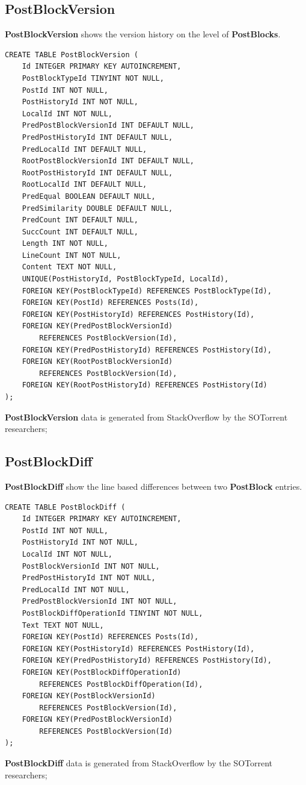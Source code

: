 \documentclass[a4paper,11pt, notitlepage]{report}
\theoremstyle{definition}
\numberwithin{equation}{section}		%
\begin{document}
\subsection{PostBlockVersion}
\textbf{PostBlockVersion} shows the version history on the level of \textbf{PostBlocks}.
\begin{lstlisting}
CREATE TABLE PostBlockVersion (
    Id INTEGER PRIMARY KEY AUTOINCREMENT,
    PostBlockTypeId TINYINT NOT NULL,
    PostId INT NOT NULL,
    PostHistoryId INT NOT NULL,
    LocalId INT NOT NULL,
    PredPostBlockVersionId INT DEFAULT NULL,
    PredPostHistoryId INT DEFAULT NULL,
    PredLocalId INT DEFAULT NULL,
    RootPostBlockVersionId INT DEFAULT NULL,
    RootPostHistoryId INT DEFAULT NULL,
    RootLocalId INT DEFAULT NULL,
    PredEqual BOOLEAN DEFAULT NULL,
    PredSimilarity DOUBLE DEFAULT NULL,
    PredCount INT DEFAULT NULL,
    SuccCount INT DEFAULT NULL,
    Length INT NOT NULL,
    LineCount INT NOT NULL,
    Content TEXT NOT NULL,
    UNIQUE(PostHistoryId, PostBlockTypeId, LocalId),
    FOREIGN KEY(PostBlockTypeId) REFERENCES PostBlockType(Id),
    FOREIGN KEY(PostId) REFERENCES Posts(Id),
    FOREIGN KEY(PostHistoryId) REFERENCES PostHistory(Id),
    FOREIGN KEY(PredPostBlockVersionId)
        REFERENCES PostBlockVersion(Id),
    FOREIGN KEY(PredPostHistoryId) REFERENCES PostHistory(Id),
    FOREIGN KEY(RootPostBlockVersionId)
        REFERENCES PostBlockVersion(Id),
    FOREIGN KEY(RootPostHistoryId) REFERENCES PostHistory(Id)
);
\end{lstlisting}
\textbf{PostBlockVersion} data is generated from StackOverflow by the SOTorrent researchers;

\subsection{PostBlockDiff}
\textbf{PostBlockDiff} show the line based differences between two \textbf{PostBlock} entries.
\begin{lstlisting}
CREATE TABLE PostBlockDiff (
    Id INTEGER PRIMARY KEY AUTOINCREMENT,
    PostId INT NOT NULL,
    PostHistoryId INT NOT NULL,
    LocalId INT NOT NULL,
    PostBlockVersionId INT NOT NULL,
    PredPostHistoryId INT NOT NULL,
    PredLocalId INT NOT NULL,
    PredPostBlockVersionId INT NOT NULL,
    PostBlockDiffOperationId TINYINT NOT NULL,
    Text TEXT NOT NULL,
    FOREIGN KEY(PostId) REFERENCES Posts(Id),
    FOREIGN KEY(PostHistoryId) REFERENCES PostHistory(Id),
    FOREIGN KEY(PredPostHistoryId) REFERENCES PostHistory(Id),
    FOREIGN KEY(PostBlockDiffOperationId)
        REFERENCES PostBlockDiffOperation(Id),
    FOREIGN KEY(PostBlockVersionId)
        REFERENCES PostBlockVersion(Id),
    FOREIGN KEY(PredPostBlockVersionId)
        REFERENCES PostBlockVersion(Id)
);
\end{lstlisting}
\textbf{PostBlockDiff} data is generated from StackOverflow by the SOTorrent researchers;
\end{document}
